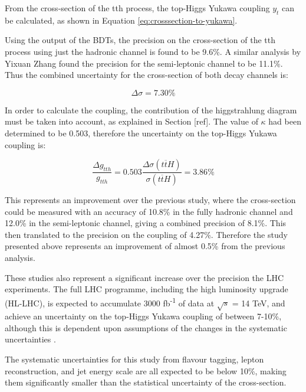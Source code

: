 From the cross-section of the tth process, the top-Higgs Yukawa coupling $y_t$ can be calculated, as shown in Equation \ref{eq:crosssection-to-yukawa}. 

Using the output of the \acrshort{BDT}s, the precision on the cross-section of the tth process using just the hadronic channel is found to be 9.6\%. A similar analysis by Yixuan Zhang found the precision for the semi-leptonic channel to be 11.1\%. Thus the combined uncertainty for the cross-section of both decay channels is:

$$\Delta\sigma = 7.30\% $$

In order to calculate the coupling, the contribution of the higgstrahlung diagram must be taken into account, as explained in Section [ref]. The value of $\kappa$ had been determined to be 0.503, therefore the uncertainty on the top-Higgs Yukawa coupling is:

$$\frac{\Delta g_{tth}}{g_{tth}} = 0.503 \frac{\Delta\sigma(t\overline{t}H)}{\sigma(t\overline{t}H)} = 3.86\% $$

This represents an improvement over the previous study, where the cross-section could be measured with an accuracy of 10.8\% in the fully hadronic channel and 12.0\% in the semi-leptonic channel, giving a combined precision of 8.1\%. This then translated to the precision on the coupling of 4.27\%. Therefore the study presented above represents an improvement of almost 0.5\% from the previous analysis.

These studies also represent a significant increase over the precision the \acrshort{LHC} experiments. The full \acrshort{LHC} programme, including the high luminosity upgrade (\acrshort{HL-LHC}), is expected to accumulate 3000 fb\textsuperscript{-1} of data at $\sqrt{s}$ = 14 TeV, and achieve an uncertainty on the top-Higgs Yukawa coupling of between 7-10\%, although this is dependent upon assumptions of the changes in the systematic uncertainties \cite{lhc-top-yukawa}.

The systematic uncertainties for this study from flavour tagging, lepton reconstruction, and jet energy scale are all expected to be below 10\%, making them significantly smaller than the statistical uncertainty of the cross-section. %

